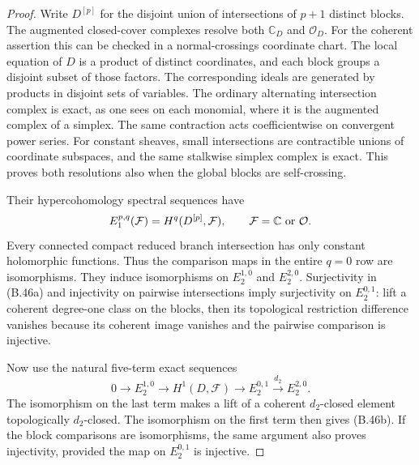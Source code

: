 \begin{proof}
Write $D^{[p]}$ for the disjoint union of intersections
of $p+1$ distinct blocks. The augmented closed-cover
complexes resolve both $\mathbb C_D$ and $\mathcal O_D$.
For the coherent assertion this can be checked in a
normal-crossings coordinate chart. The local equation
of $D$ is a product of distinct coordinates, and each
block groups a disjoint subset of those factors.
The corresponding ideals are generated by products
in disjoint sets of variables. The ordinary alternating
intersection complex is exact, as one sees on each
monomial, where it is the augmented complex of a
simplex. The same contraction acts coefficientwise
on convergent power series. For constant sheaves,
small intersections are contractible unions of
coordinate subspaces, and the same stalkwise simplex
complex is exact. This proves both resolutions also
when the global blocks are self-crossing.

Their hypercohomology spectral sequences have
\[
 E_1^{p,q}(\mathcal F)=H^q(D^{[p]},\mathcal F),
 \qquad \mathcal F=\mathbb C\ \hbox{or}\ \mathcal O.
\]
Every connected compact reduced branch intersection
has only constant holomorphic functions. Thus the
comparison maps in the entire $q=0$ row are
isomorphisms. They induce isomorphisms on
$E_2^{1,0}$ and $E_2^{2,0}$. Surjectivity in (B.46a)
and injectivity on pairwise intersections imply
surjectivity on $E_2^{0,1}$: lift a coherent
degree-one class on the blocks, then its topological
restriction difference vanishes because its coherent
image vanishes and the pairwise comparison is
injective.

Now use the natural five-term exact sequences
\[
 0\longrightarrow E_2^{1,0}
 \longrightarrow H^1(D,\mathcal F)
 \longrightarrow E_2^{0,1}
 \xrightarrow{d_2} E_2^{2,0}.
\]
The isomorphism on the last term makes a lift of a
coherent $d_2$-closed element topologically
$d_2$-closed. The isomorphism on the first term then
gives (B.46b). If the block comparisons are
isomorphisms, the same argument also proves
injectivity, provided the map on $E_2^{0,1}$ is
injective.


\end{proof}
